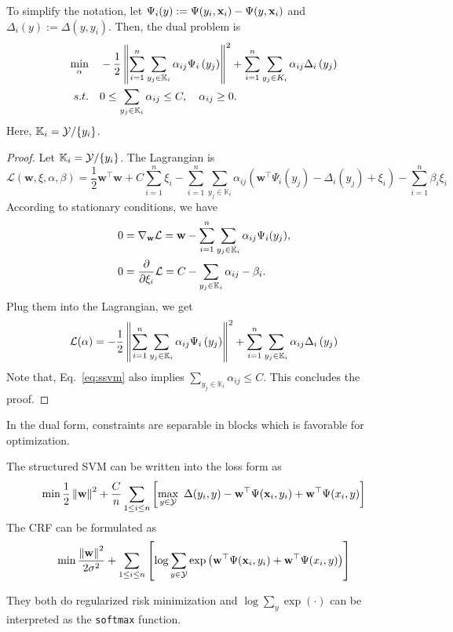\begin{definition}
To simplify the notation, let $\Psi_i(y):=\Psi(y_i, \mathbf{x}_i)-\Psi(y, \mathbf{x}_i)$ and $\Delta_i(y):=\Delta(y, y_i)$. Then, the dual problem is
\begin{align}
	\min_{\alpha} & \quad -\frac{1}{2}\left\lVert \sum_{i=1}^{n} \sum_{y_{j} \in \mathbb{K}_{i}} \alpha_{i j} \Psi_{i}\left(y_{j}\right) \right\rVert^{2}+\sum_{i=1}^{n} \sum_{y_{j} \in {K}_{i}} \alpha_{i j} \Delta_{i}\left(y_{j}\right) \\
	s.t. & \quad  0 \leq \sum_{y_{j} \in \mathbb{K}_{i}} \alpha_{i j} \leq C, \quad  \alpha_{i j} \geq 0.
\end{align}
Here, $\mathbb{K}_i = \mathcal{Y} \slash \{y_i\}$.
\end{definition}
\begin{proof}
	Let $\mathbb{K}_i = \mathcal{Y} \slash \{y_i\}$. The Lagrangian is
	\begin{equation}
		\mathcal{L}(\mathbf{w}, \xi, \alpha, \beta)=\frac{1}{2} \mathbf{w}^{\top} \mathbf{w}+C \sum_{i=1}^{n} \xi_{i}-\sum_{i=1}^{n} \sum_{y_{j} \in \mathbb{K}_{i}} \alpha_{i j}\left(\mathbf{w}^{\top} \Psi_{i}\left(y_{j}\right)-\Delta_{i}\left(y_{j}\right)+\xi_{i}\right)-\sum_{i=1}^{n} \beta_{i} \xi_{i}
	\end{equation}
	According to stationary conditions, we have
	\begin{align}
		0 & = \nabla_{\mathbf{w}} \mathcal{L} = \mathbf{w} - \sum_{i = 1}^n  \sum_{y_{j} \in \mathbb{K}_{i}} \alpha_{i j} \Psi_i (y_j), \\
		0 & = \frac{\partial}{\partial \xi_i} \mathcal{L} = C - \sum_{y_{j} \in \mathbb{K}_{i}} \alpha_{i j} - \beta_i. \label{eq:ssvm}
	\end{align}
	Plug them into the Lagrangian, we get
	\begin{align}
		\mathcal{L}(\alpha) = -\frac{1}{2}\left\lVert \sum_{i=1}^{n} \sum_{y_{j} \in \mathbb{K}_{i}} \alpha_{i j} \Psi_{i}\left(y_{j}\right) \right\rVert^{2}+\sum_{i=1}^{n} \sum_{y_{j} \in \mathbb{K}_{i}} \alpha_{i j} \Delta_{i}\left(y_{j}\right)
	\end{align}
	Note that, Eq.~\ref{eq:ssvm} also implies $\sum_{y_{j} \in \mathbb{K}_{i}} \alpha_{i j} \leq C$. This concludes the proof.
\end{proof}

\noindent \remark In the dual form, constraints are separable in blocks which is favorable for optimization.

\begin{property}
The structured SVM can be written into the loss form as
$$
	\min \frac{1}{2} \left\lVert \mathbf{w} \right\rVert^2 + \frac{C}{n} \sum_{1 \leq i \leq n}\left[ \max_{y \in \mathcal{Y}} \ \Delta(y_i, y) - \mathbf{w}^\top \Psi(\mathbf{x}_i, y_i) + \mathbf{w}^\top \Psi(x_i, y) \right]
$$	
The CRF can be formulated as
$$
	\min \frac{ \left\lVert \mathbf{w} \right\rVert^2}{2\sigma^2} + \sum_{1 \leq i \leq n}\left[ \log \sum_{y \in \mathcal{Y}} \exp\left( \mathbf{w}^\top \Psi(\mathbf{x}_i, y_i) + \mathbf{w}^\top \Psi(x_i, y) \right) \right]
$$
\end{property}
\remark  They both do regularized risk minimization and $\log \sum_y \exp(\cdot)$ can be interpreted as the \texttt{softmax} function.

